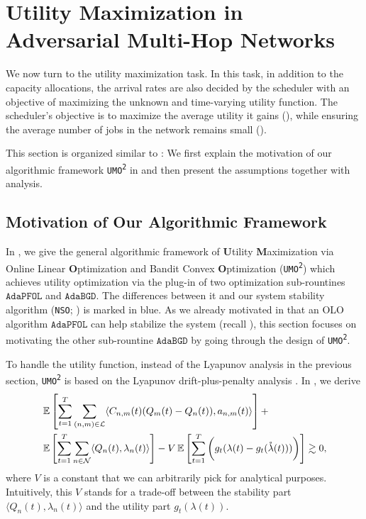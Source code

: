 \documentclass[11pt,fullpage,letterpaper]{article} %
\renewcommand{\bm}[1]{#1}%
\newcommand{\E}{\operatornamewithlimits{\mathbb{E}}}
\newcommand{\mN}{{\mathcal N}}
\newcommand{\mL}{{\mathcal L}}
\newcommand{\SSAlg}{\texttt{NSO}\xspace}
\newcommand{\UMAlg}{\texttt{UMO}\textsuperscript{\texttt{2}}\xspace}
\newcommand{\OLOAlg}{\texttt{AdaPFOL}\xspace}
\newcommand{\BCOAlg}{\texttt{AdaBGD}\xspace}
\newcommand{\OLO}{\OLOAlg}
\newcommand{\BCO}{\BCOAlg}
\begin{document}
\section{Utility Maximization in Adversarial Multi-Hop Networks}\label{sec:multi-hop utility}
We now turn to the utility maximization task. 
In this task, in addition to the capacity allocations, the arrival rates are also decided by the scheduler with an objective of maximizing the unknown and time-varying utility function.
The scheduler's objective is to maximize the average utility it gains (), while ensuring the average number of jobs in the network remains small (). 

This section is organized similar to : We first explain the motivation of our algorithmic framework \UMAlg in  and then present the assumptions together with analysis. 

\subsection{Motivation of Our Algorithmic Framework}\label{sec:multi-hop utility sketch}
In , we give the general algorithmic framework of \textbf{U}tility \textbf{M}aximization via Online Linear \textbf{O}ptimization and Bandit Convex \textbf{O}ptimization (\UMAlg) which achieves utility optimization via the plug-in of two optimization sub-rountines $\OLO$ and $\BCO$.
The differences between it and our system stability algorithm (\SSAlg; ) is marked in blue.
As we already motivated in  that an OLO algorithm $\OLO$ can help stabilize the system (recall ), this section focuses on motivating the other sub-rountine $\BCO$ by going through the design of \UMAlg.

To handle the utility function, instead of the Lyapunov analysis in the previous section, \UMAlg is based on the Lyapunov drift-plus-penalty analysis \citep[Theorem 4.2]{neely2010stochastic}.
In , we derive
\begin{align}
&\E\left [\sum_{t=1}^T \sum_{(n,m)\in \mL} \langle C_{n,m}(t) (\bm Q_m(t) - \bm Q_n(t)), \bm a_{n,m}(t)\rangle\right ] + \nonumber\\
&\E\left [\sum_{t=1}^T \sum_{n\in \mN} \langle \bm Q_n(t),\bm \lambda_n(t)\rangle\right ] - V \E\left [\sum_{t=1}^T \bigg (g_t(\bm \lambda(t) - g_t(\mathring{\bm \lambda}(t)))\bigg )\right ]\gtrsim 0,\label{eq:multi-hop utility Lyapunov informal}
\end{align}
where $V$ is a constant that we can arbitrarily pick for analytical purposes.
Intuitively, this $V$ stands for a trade-off between the stability part $\langle \bm Q_n(t),\bm \lambda_n(t)\rangle$ and the utility part $g_t(\bm \lambda(t))$.
\end{document}
